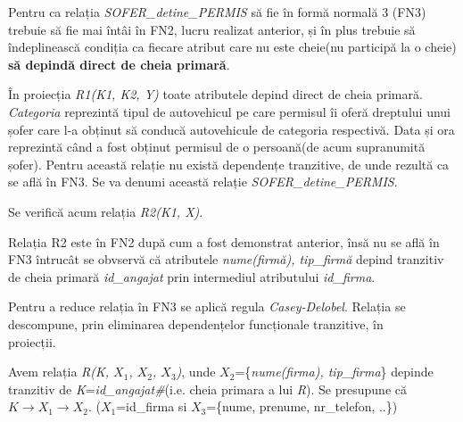 \documentclass[12pt, a4paper]{article}
\begin{document}
Pentru ca relația \emph{SOFER\_detine\_PERMIS} să fie în formă normală 3 (FN3) trebuie să fie mai întâi în FN2, lucru realizat anterior, și în plus trebuie să îndeplinească condiția ca fiecare atribut care nu este cheie(nu participă la o cheie) \textbf{să depindă direct de cheia primară}.

În proiecția \emph{R1(K1, K2, Y)} toate atributele depind direct de cheia primară. \emph{Categoria} reprezintă tipul de autovehicul pe care permisul îi oferă dreptului unui șofer care l-a obținut să conducă autovehicule de categoria respectivă. Data și ora reprezintă când a fost obținut permisul de o persoană(de acum supranumită șofer). Pentru această relație nu există dependențe tranzitive, de unde rezultă ca se află în FN3. Se va denumi această relație \emph{SOFER\_detine\_PERMIS}.

Se verifică acum relația \emph{R2(K1, X)}.

\begin{table}[!htbp]
\begin{center}
\caption{Relația \emph{R2(K1, X)}}\label{tab5}
\end{center}
\end{table}

Relația R2 este în FN2 după cum a fost demonstrat anterior, însă nu se află în FN3 întrucât se obvservă că atributele \emph{nume(firmă), tip\_firmă} depind tranzitiv de cheia primară \emph{id\_angajat} prin intermediul atributului \emph{id\_firma}.

Pentru a reduce relația în FN3 se aplică regula \emph{Casey-Delobel}. Relația se descompune, prin eliminarea dependențelor funcționale tranzitive, în \\proiecții.

Avem relația \emph{R(K, $X_1$, $X_2$, $X_3$)}, unde $X_2$=\{\emph{nume(firma), tip\_firma}\} depinde tranzitiv de \emph{K}=\emph{id\_angajat\#}(i.e. cheia primara a lui \emph{R}). Se presupune că $K\rightarrow X_1\rightarrow X_2$. ($X_1$=id\_firma si $X_3$=\{nume, prenume, nr\_telefon, ..\})
\end{document}
